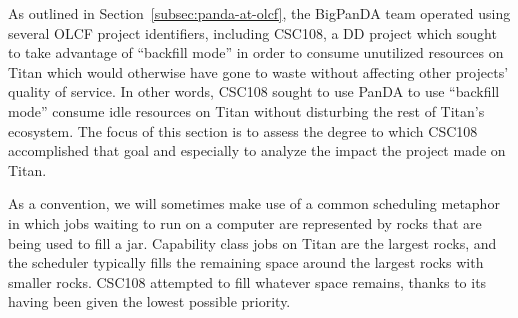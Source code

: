 
%
%


As outlined in Section~\ref{subsec:panda-at-olcf}, the BigPanDA team operated
using several OLCF project identifiers, including CSC108, a DD project which
sought to take advantage of ``backfill mode'' in order to consume unutilized
resources on Titan which would otherwise have gone to waste without affecting
other projects' quality of service. In other words, CSC108 sought to use PanDA
to use ``backfill mode'' consume idle resources on Titan without disturbing
the rest of Titan's ecosystem. The focus of this section is to assess the
degree to which CSC108 accomplished that goal and especially to analyze the
impact the project made on Titan.



As a convention, we will sometimes make use of a common scheduling metaphor in
which jobs waiting to run on a computer are represented by rocks that are being
used to fill a jar. Capability class jobs on Titan are the largest rocks, and
the scheduler typically fills the remaining space around the largest rocks
with smaller rocks. CSC108 attempted to fill whatever space remains, thanks
to its having been given the lowest possible priority.

